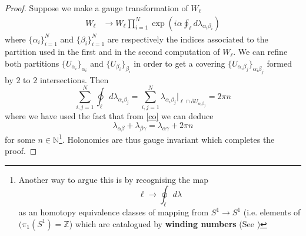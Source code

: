 \documentclass[11pt]{article}
\theoremstyle{definition}
\numberwithin{equation}{section}
\begin{document}
\begin{proof}
Suppose we make a gauge transformation of $W_{\ell}$
\begin{equation}
\begin{aligned}
    W_{\ell} &\to W_{\ell} \prod_{i=1}^N \exp(i \alpha \oint_{\ell} d \lambda_{\alpha_i \beta_i})
    \end{aligned}
\end{equation}
where $\{\alpha_i\}_{i=1}^N$ and $\{\beta_i\}_{i=1}^N$ are respectively the indices associated to the partition used in the first and in the second computation of $W_{\ell}$. We can refine both partitions $\{U_{\alpha_i}\}_{\alpha_i}$ and $\{U_{\beta_i}\}_{\beta_i}$ in order to get a covering $\{U_{\alpha_i  \beta_j}\}_{\alpha_i \beta_j}$ formed by $2$ to $2$ intersections. Then
\begin{equation}
    \sum_{i,j=1}^N   \oint_{\ell} d \lambda_{\alpha_i \beta_j} = \sum_{i,j=1}^N \lambda_{\alpha_i \beta_j}|_{\ell \cap \partial U_{\alpha_i \beta_j}} = 2 \pi n
\end{equation}
where we have used the fact that from \eqref{co} we can deduce
\begin{equation}
    \lambda_{\alpha \beta} + \lambda_{\beta \gamma} = \lambda_{\alpha \gamma} + 2 \pi n
\end{equation}
for some $n \in \mathbb{N}$\footnote{Another way to argue this is by recognising the map
\begin{equation}
    \ell \to \oint_{\ell} d \lambda
\end{equation}
as an homotopy equivalence classes of mapping from $S^1 \to S^1$ (i.e. elements of $(\pi_1(S^1)= \mathbb{Z}$) which are catalogued by \textbf{winding numbers} (See \cite[Section 2.1.2]{percacci}) }. Holonomies are thus gauge invariant which completes the proof.  
\end{proof}
\end{document}
